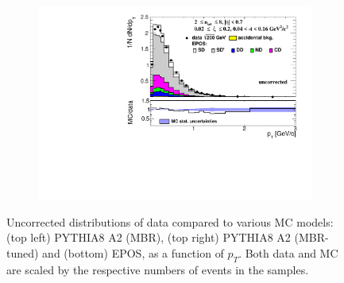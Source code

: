\begin{figure}[h!]
\begin{subfigure}{.45\textwidth}
		\includegraphics[width=\linewidth, page=1]{chapters/chrgSTAR/img/nonSD/chrg/SDT_epos_xi0_RP_starsim_pt.pdf}
	\end{subfigure}
	\begin{minipage}{.45\textwidth}
		\caption[Uncorrected distributions of data compared to various MC models: PYTHIA8 A2 (MBR), PYTHIA8 A2 (MBR-tuned) and EPOS, as a function of $p_T$.]{Uncorrected distributions of data compared to various MC models: (top left) PYTHIA8 A2 (MBR), (top right) PYTHIA8 A2 (MBR-tuned) and (bottom) EPOS, as a function of $p_T$. Both data and MC are scaled by the respective numbers of events in the samples.}
		\label{fig:nonSDpt}
	\end{minipage}
	
\end{figure}

